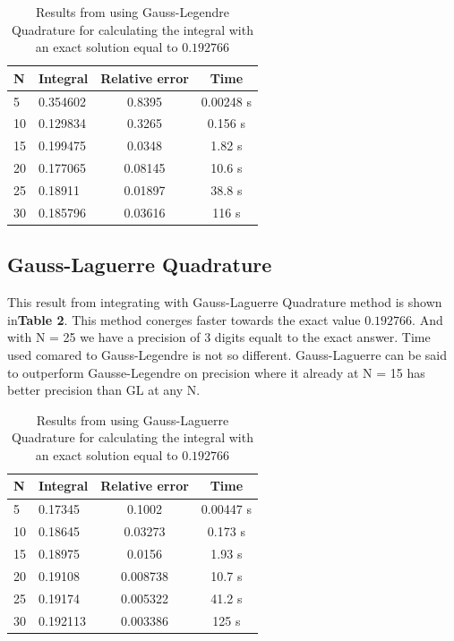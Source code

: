 \documentclass[twoside,twocolumn]{article}
\begin{document}
\begin{table}[h]
\centering
\begin{tabular}{|l|l|c|c|}
\hline
N  & Integral & \multicolumn{1}{l|}{Relative error} & Time      \\ \hline
5  & 0.354602 & 0.8395                              & 0.00248 s \\ \hline
10 & 0.129834 & 0.3265                              & 0.156 s   \\ \hline
15 & 0.199475 & 0.0348                              & 1.82 s    \\ \hline
20 & 0.177065 & 0.08145                             & 10.6 s    \\ \hline
25 & 0.18911  & 0.01897                             & 38.8 s    \\ \hline
30 & 0.185796 & 0.03616                             & 116 s     \\ \hline
\end{tabular}
\caption{Results from using Gauss-Legendre Quadrature for calculating the integral with an exact solution equal to $0.192766$}
\end{table}


\subsection{Gauss-Laguerre Quadrature}
This result from integrating with Gauss-Laguerre Quadrature method is shown in\textbf{Table 2}. This method conerges faster towards the exact value  $0.192766$. And with N = 25 we have a precision of 3 digits equalt to the exact answer. Time used comared to Gauss-Legendre is not so different. Gauss-Laguerre can be said to outperform Gausse-Legendre on precision where it already at N = 15 has better precision than GL at any N.

\begin{table}[h]
\centering
\begin{tabular}{|l|l|c|c|}
\hline
N  & Integral & \multicolumn{1}{l|}{Relative error} & Time      \\ \hline
5  & 0.17345  & 0.1002                              & 0.00447 s \\ \hline
10 & 0.18645  & 0.03273                             & 0.173 s   \\ \hline
15 & 0.18975  & 0.0156                              & 1.93 s    \\ \hline
20 & 0.19108  & 0.008738                            & 10.7 s    \\ \hline
25 & 0.19174  & 0.005322                            & 41.2 s    \\ \hline
30 & 0.192113 & 0.003386                            & 125 s     \\ \hline
\end{tabular}
\caption{Results from using Gauss-Laguerre Quadrature for calculating the integral with an exact solution equal to $0.192766$}
\end{table}
\end{document}
